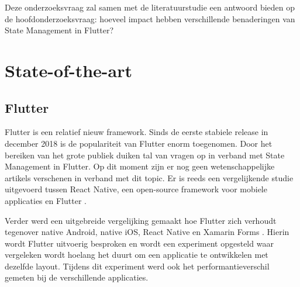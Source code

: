 Deze onderzoeksvraag zal samen met de literatuurstudie een antwoord bieden op de hoofdonderzoeksvraag: hoeveel impact hebben verschillende benaderingen van State Management in Flutter?


\section{State-of-the-art}
\label{sec:state-of-the-art}
\subsection*{Flutter}
Flutter is een relatief nieuw framework. Sinds de eerste stabiele release in december 2018 is de populariteit
van Flutter enorm toegenomen. Door het bereiken van het grote publiek duiken tal van vragen op in verband met 
State Management in Flutter. Op dit moment zijn er nog geen wetenschappelijke artikels verschenen in verband met dit topic.
Er is reeds een vergelijkende studie uitgevoerd tussen React Native, een open-source framework voor mobiele applicaties en Flutter \autocite{Wu2018}.

Verder werd een uitgebreide vergelijking gemaakt hoe Flutter zich verhoudt tegenover native Android, native iOS,
React Native en Xamarin Forms \autocite{Coninck2019}.
Hierin wordt Flutter uitvoerig besproken en wordt een experiment opgesteld waar vergeleken wordt hoelang het duurt
om een applicatie te ontwikkelen met dezelfde layout. Tijdens dit experiment werd ook het performantieverschil gemeten bij de verschillende applicaties. 

%



